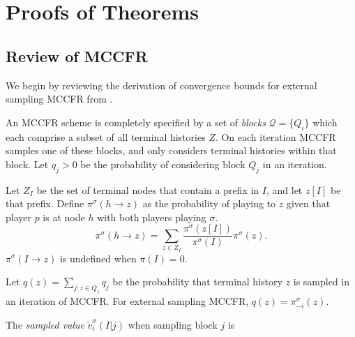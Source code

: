 \documentclass{article}
\begin{document}




\section{Proofs of Theorems}
\label{app:proof}
\subsection{Review of MCCFR}

We begin by reviewing the derivation of convergence bounds for external sampling MCCFR from \citealt{Lanctot09:Monte}.

An MCCFR scheme is completely specified by a set of \emph{blocks} $\mathcal{Q}=\{Q_i\}$ which each comprise a subset of all terminal histories $Z$. On each iteration MCCFR samples one of these blocks, and only considers terminal histories within that block. Let $q_j > 0$ be the probability of considering block $Q_j$ in an iteration. 

Let $Z_I$ be the set of terminal nodes that contain a prefix in $I$, and let $z[I]$ be that prefix. 
Define $\pi^\sigma(h\to z)$ as the probability of playing to $z$ given that player $p$ is at node $h$ with both players playing $\sigma$. $$\pi^\sigma(h\to z) = \sum_{z\in Z_I} \frac{\pi^\sigma(z[I])}{\pi^\sigma(I)}  \pi^\sigma(z).$$ 
$\pi^\sigma(I\to z)$ is undefined when $\pi(I)=0$.

Let $q(z)=\sum_{j:z\in Q_j}{q_j}$ be the probability that terminal history $z$ is sampled in an iteration of MCCFR. For external sampling MCCFR, $q(z)=\pi^\sigma_{-i}(z)$.

The \emph{sampled value} $\tilde{v}^\sigma_i(I|j)$ when sampling block $j$ is
\end{document}
